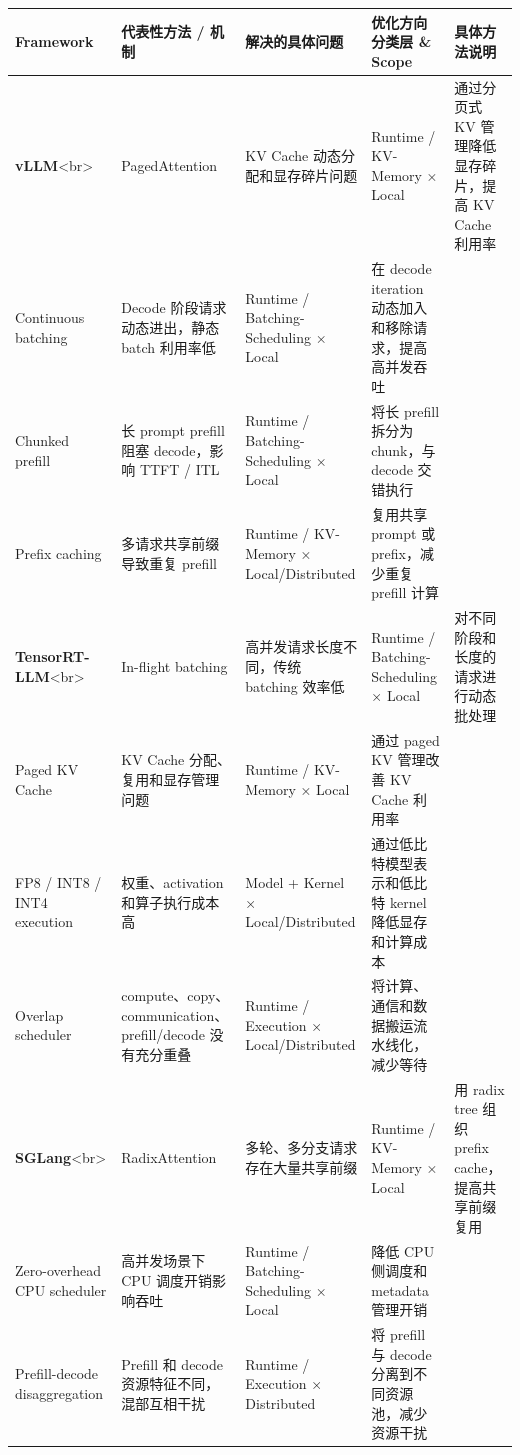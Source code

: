 \documentclass[a4paper,10pt]{ctexart}
\begin{document}
\begin{table}[H]
\centering
\scriptsize
\setlength{\tabcolsep}{3pt}
\renewcommand{\arraystretch}{1.15}
\begin{tabularx}{\textwidth}{|X|X|X|X|X|}
\hline
\textbf{\textbf{Framework}} & \textbf{\textbf{代表性方法 / 机制}} & \textbf{\textbf{解决的具体问题}} & \textbf{\textbf{优化方向分类层 \& Scope}} & \textbf{\textbf{具体方法说明}} \\ \hline
\textbf{vLLM}<br> & PagedAttention & KV Cache 动态分配和显存碎片问题 & Runtime / KV-Memory × Local & 通过分页式 KV 管理降低显存碎片，提高 KV Cache 利用率 \\ \hline
Continuous batching & Decode 阶段请求动态进出，静态 batch 利用率低 & Runtime / Batching-Scheduling × Local & 在 decode iteration 动态加入和移除请求，提高高并发吞吐 &  \\ \hline
Chunked prefill & 长 prompt prefill 阻塞 decode，影响 TTFT / ITL & Runtime / Batching-Scheduling × Local & 将长 prefill 拆分为 chunk，与 decode 交错执行 &  \\ \hline
Prefix caching & 多请求共享前缀导致重复 prefill & Runtime / KV-Memory × Local/Distributed & 复用共享 prompt 或 prefix，减少重复 prefill 计算 &  \\ \hline
\textbf{TensorRT-LLM}<br> & In-flight batching & 高并发请求长度不同，传统 batching 效率低 & Runtime / Batching-Scheduling × Local & 对不同阶段和长度的请求进行动态批处理 \\ \hline
Paged KV Cache & KV Cache 分配、复用和显存管理问题 & Runtime / KV-Memory × Local & 通过 paged KV 管理改善 KV Cache 利用率 &  \\ \hline
FP8 / INT8 / INT4 execution & 权重、activation 和算子执行成本高 & Model + Kernel × Local/Distributed & 通过低比特模型表示和低比特 kernel 降低显存和计算成本 &  \\ \hline
Overlap scheduler & compute、copy、communication、prefill/decode 没有充分重叠 & Runtime / Execution × Local/Distributed & 将计算、通信和数据搬运流水线化，减少等待 &  \\ \hline
\textbf{SGLang}<br> & RadixAttention & 多轮、多分支请求存在大量共享前缀 & Runtime / KV-Memory × Local & 用 radix tree 组织 prefix cache，提高共享前缀复用 \\ \hline
Zero-overhead CPU scheduler & 高并发场景下 CPU 调度开销影响吞吐 & Runtime / Batching-Scheduling × Local & 降低 CPU 侧调度和 metadata 管理开销 &  \\ \hline
Prefill-decode disaggregation & Prefill 和 decode 资源特征不同，混部互相干扰 & Runtime / Execution × Distributed & 将 prefill 与 decode 分离到不同资源池，减少资源干扰 &  \\ \hline

\end{tabularx}
\end{table}
\end{document}
